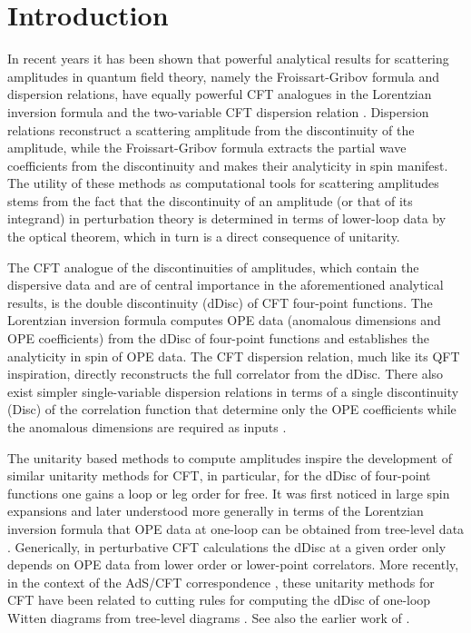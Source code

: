 
\section{Introduction}
\label{sec:intro}

In recent years it has been shown that powerful analytical results for scattering amplitudes in quantum field theory, namely the Froissart-Gribov formula and dispersion relations, have equally powerful CFT analogues in the Lorentzian inversion formula \cite{Caron_Huot_2017,Simmons_Duffin_2018,Kravchuk:2018htv,Lemos:2017vnx,Liendo:2019jpu} and the two-variable CFT dispersion relation \cite{Carmi:2019cub,Caron-Huot:2020adz}. Dispersion relations reconstruct a scattering amplitude from the discontinuity of the amplitude, while the Froissart-Gribov formula extracts the partial wave coefficients from the discontinuity and makes their analyticity in spin manifest. The utility of these methods as computational tools for scattering amplitudes stems from the fact that the discontinuity of an amplitude (or that of its integrand) in perturbation theory is determined in terms of lower-loop data by the optical theorem, which in turn is a direct consequence of unitarity. 

The CFT analogue of the discontinuities of amplitudes, which contain the dispersive data and are of central importance in the aforementioned analytical results, is the double discontinuity (dDisc) of CFT four-point functions. The Lorentzian inversion formula 
computes OPE data (anomalous dimensions and OPE coefficients) from the dDisc of four-point functions and establishes the analyticity in spin of OPE data. The CFT dispersion relation, much like its QFT inspiration, directly reconstructs the full correlator from the dDisc. There also exist simpler single-variable dispersion relations in terms of a single discontinuity (Disc) of the correlation function that determine only the OPE coefficients while the anomalous dimensions are required as inputs \cite{Bissi:2019kkx}. 

The unitarity based methods to compute amplitudes  inspire the development of  similar unitarity methods for CFT, in particular, 
for the dDisc of four-point functions one gains a loop or leg order for free.
It was first noticed in large spin expansions \cite{Alday:2016njk,Alday:2016jfr,Aharony:2016dwx} and later understood more generally in terms of the Lorentzian inversion formula
that OPE data at one-loop can be obtained from tree-level data \cite{Alday:2017vkk,Alday:2017zzv}. Generically, in perturbative CFT calculations the dDisc at a given order only depends on OPE data from lower order or lower-point correlators. More recently, in the context of the AdS/CFT correspondence \cite{Maldacena:1997re,Witten:1998qj,Gubser:1998bc},
these unitarity methods for CFT have been related to cutting rules for computing the dDisc of one-loop Witten diagrams \cite{Liu:2018jhs} from tree-level diagrams \cite{Ponomarev:2019ofr,Meltzer:2019nbs,Meltzer:2020qbr}. 
See also the earlier work of \cite{Fitzpatrick:2011dm}. 

